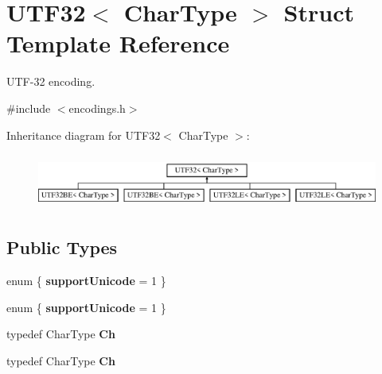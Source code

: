 \hypertarget{struct_u_t_f32}{}\section{U\+T\+F32$<$ Char\+Type $>$ Struct Template Reference}
\label{struct_u_t_f32}


U\+T\+F-\/32 encoding.  




{\ttfamily \#include $<$encodings.\+h$>$}

Inheritance diagram for U\+T\+F32$<$ Char\+Type $>$\+:\begin{figure}[H]
\begin{center}
\leavevmode
\includegraphics[height=1.830065cm]{struct_u_t_f32}
\end{center}
\end{figure}
\subsection*{Public Types}
\begin{DoxyCompactItemize}
\item 
enum \{ {\bfseries support\+Unicode} = 1
 \}\hypertarget{struct_u_t_f32_abe791c52b9d1305aacf92ddc15c11ab4}{}\label{struct_u_t_f32_abe791c52b9d1305aacf92ddc15c11ab4}

\item 
enum \{ {\bfseries support\+Unicode} = 1
 \}\hypertarget{struct_u_t_f32_a05529b5a9a49ebd8b4d913aaaeebfc8d}{}\label{struct_u_t_f32_a05529b5a9a49ebd8b4d913aaaeebfc8d}

\item 
typedef Char\+Type {\bfseries Ch}\hypertarget{struct_u_t_f32_ab4502672d56436e730ca5f647bb52be9}{}\label{struct_u_t_f32_ab4502672d56436e730ca5f647bb52be9}

\item 
typedef Char\+Type {\bfseries Ch}\hypertarget{struct_u_t_f32_ab4502672d56436e730ca5f647bb52be9}{}\label{struct_u_t_f32_ab4502672d56436e730ca5f647bb52be9}

\end{DoxyCompactItemize}
